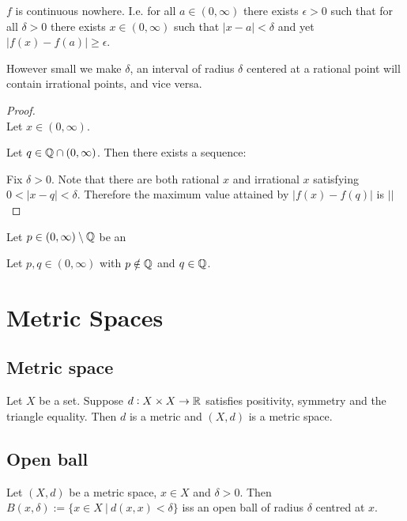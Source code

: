 \begin{theorem*}
  $f$ is continuous nowhere. I.e. for all $a \in (0, \infty)$ there exists $\epsilon > 0$ such that
  for all $\delta > 0$ there exists $x \in (0, \infty)$ such that $|x - a| < \delta$ and yet
  $|f(x) - f(a)| \geq \epsilon$.
\end{theorem*}

\begin{intuition*}
  However small we make $\delta$, an interval of radius $\delta$ centered at a rational point will
  contain irrational points, and vice versa.
\end{intuition*}

\begin{proof}~\\
  Let $x \in (0, \infty)$.

  Let $q \in \mathbb{Q} \cap (0, \infty)$. Then there exists a sequence:




  Fix $\delta > 0$. Note that there are both rational $x$ and
  irrational $x$ satisfying $0 < |x - q| < \delta$. Therefore the maximum value attained by
  $|f(x) - f(q)|$ is $||$
\end{proof}



Let $p \in (0, \infty) \setminus \mathbb{Q}$ be an

Let $p, q \in (0, \infty)$ with $p \notin \mathbb{Q}$ and $q \in \mathbb{Q}$.


\newpage
\section{Metric Spaces}

\subsection{Metric space}
\begin{definition}
  Let $X$ be a set. Suppose $d:X \times X \to \mathbb{R}$ satisfies positivity, symmetry and the triangle
  equality. Then $d$ is a metric and $(X, d)$ is a metric space.
\end{definition}

\subsection{Open ball}
\begin{definition}
  Let $(X, d)$ be a metric space, $x \in X$ and $\delta > 0$. Then
  $B(x, \delta) := \{x \in X ~|~ d(x, x) < \delta\}$ iss an open ball of radius $\delta$ centred at
  $x$.
\end{definition}

